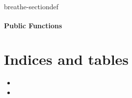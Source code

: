\documentclass[letterpaper,10pt,english]{sphinxmanual}
\begin{document}
\begin{fulllineitems}
\label{\detokenize{api/classtest:_CPPv44test}}
\pysigstartsignatures
\pysigstartmultiline
{}
\pysigstopmultiline
\pysigstopsignatures
\begin{sphinxuseclass}{breathe-sectiondef}\subsubsection*{Public Functions}

\begin{fulllineitems}
\label{\detokenize{api/classtest:_CPPv4N4test4testEv}}
\pysigstartsignatures
\pysigstartmultiline
{}
\pysigstopmultiline
\pysigstopsignatures
\end{fulllineitems}


\end{sphinxuseclass}
\end{fulllineitems}



\chapter{Indices and tables}
\label{\detokenize{index:indices-and-tables}}\begin{itemize}
\item {} 
\sphinxAtStartPar
{}

\item {} 
\sphinxAtStartPar
{}

\end{itemize}



\renewcommand{\indexname}{Index}
\printindex
\end{document}
